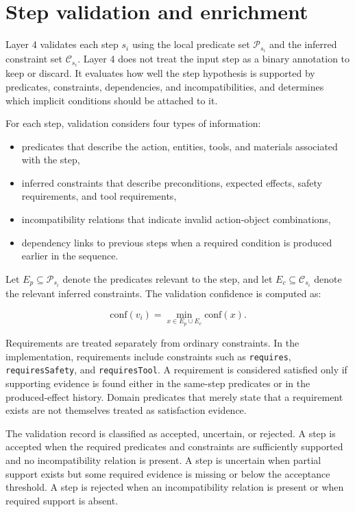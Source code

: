 \section{Step validation and enrichment}
\label{sec:step-validation-enrichment}

Layer 4 validates each step $s_i$ using the local predicate set $\mathcal{P}_{s_i}$ and the inferred constraint set $\mathcal{C}_{s_i}$. Layer 4 does not treat the input step as a binary annotation to keep or discard. It evaluates how well the step hypothesis is supported by predicates, constraints, dependencies, and incompatibilities, and determines which implicit conditions should be attached to it.

For each step, validation considers four types of information:

\begin{itemize}
    \item predicates that describe the action, entities, tools, and materials associated with the step,
    \item inferred constraints that describe preconditions, expected effects, safety requirements, and tool requirements,
    \item incompatibility relations that indicate invalid action-object combinations,
    \item dependency links to previous steps when a required condition is produced earlier in the sequence.
\end{itemize}

Let $E_p \subseteq \mathcal{P}_{s_i}$ denote the predicates relevant to the step, and let $E_c \subseteq \mathcal{C}_{s_i}$ denote the relevant inferred constraints. The validation confidence is computed as:

\[
\text{conf}(v_i) = \min_{x \in E_p \cup E_c} \text{conf}(x).
\]


Requirements are treated separately from ordinary constraints. In the implementation, requirements include constraints such as \texttt{requires}, \texttt{requiresSafety}, and \texttt{requiresTool}. A requirement is considered satisfied only if supporting evidence is found either in the same-step predicates or in the produced-effect history. Domain predicates that merely state that a requirement exists are not themselves treated as satisfaction evidence.


The validation record is classified as accepted, uncertain, or rejected. A step is accepted when the required predicates and constraints are sufficiently supported and no incompatibility relation is present. A step is uncertain when partial support exists but some required evidence is missing or below the acceptance threshold. A step is rejected when an incompatibility relation is present or when required support is absent.

